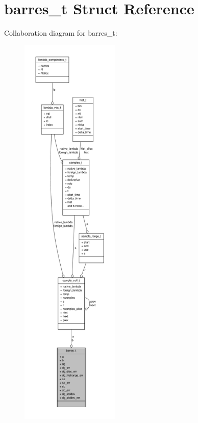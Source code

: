\hypertarget{structbarres__t}{\section{barres\-\_\-t \-Struct \-Reference}
\label{structbarres__t}
}


\-Collaboration diagram for barres\-\_\-t\-:
\nopagebreak
\begin{figure}[H]
\begin{center}
\leavevmode
\includegraphics[height=550pt]{structbarres__t__coll__graph}
\end{center}
\end{figure}
